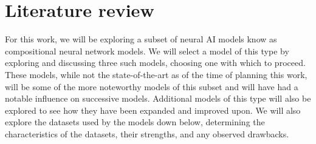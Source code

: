 \chapter{Literature review}
\label{chp:literature_review}

For this work, we will be exploring a subset of neural AI models know as compositional neural network models.
We will select a model of this type by exploring and discussing three such models, choosing one with which to proceed.
These models, while not the state-of-the-art as of the time of planning this work, will be some of the more noteworthy models of this subset and will have had a notable influence on successive models.
Additional models of this type will also be explored to see how they have been expanded and improved upon.
We will also explore the datasets used by the models down below, determining the characteristics of the datasets, their strengths, and any observed drawbacks.


\clearpage


\clearpage


\clearpage


\clearpage
